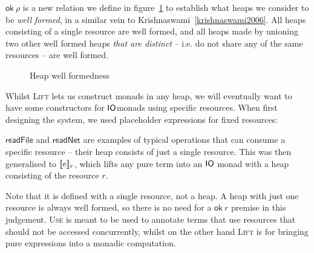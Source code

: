 $\textsf{ok} \ \rho$ is a new relation we define in
figure~\ref{fig:heapwellformedness} to establish what heaps we
consider to be \textit{well formed}, in a similar vein to
Krishnaswami~\ref{krishnaswami2006}. All heaps consisting of a single
resource are well formed, and all heaps made by unioning two other well
formed heaps \textit{that are distinct} -- i.e. do not share any of the
same resources -- are well formed.
\begin{figure}
  \centering
  \caption{Heap well formedness}
  \label{fig:heapwellformedness}
\end{figure}

Whilst \textsc{Lift} lets us construct monads in any heap, we will
eventually want to have some constructors for $\IO$monads using
specific resources. When first designing the system, we used
placeholder expressions for fixed resources:
$\textsf{readFile}$ and $\textsf{readNet}$ are examples of typical
operations that can consume a specific resource -- their heap consists
of just a single resource. This was then generalised to
$\use{r}{e}$, which lifts any pure term into an $\IO$ monad with a heap
consisting of the resource $r$.
\begin{mathpar}
\end{mathpar}
Note that it is defined with a single resource, not a heap. A heap
with just one resource is always well formed, so there is no need
for a $\textsf{ok} \ r$ premise in this judgement.
\textsc{Use} is meant to be used to annotate terms that use resources that
should not be accessed concurrently, whilst on the other hand
\textsc{Lift} is for bringing pure expressions into a monadic
computation.

